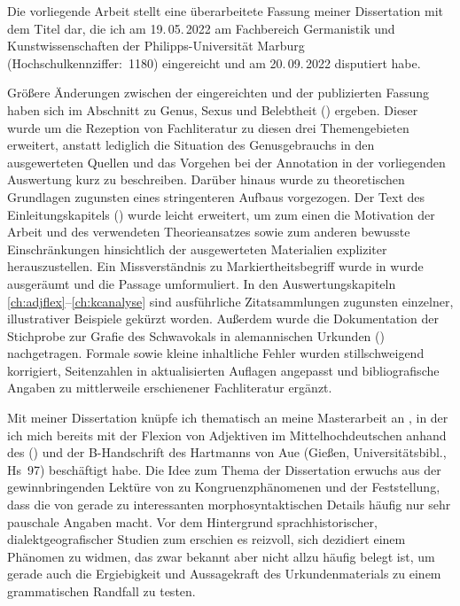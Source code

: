 \addchap{\lsPrefaceTitle}

Die vorliegende Arbeit stellt eine überarbeitete Fassung meiner Dissertation
mit dem Titel  dar, die ich am 19.\,05.\,2022 am Fachbereich
Germanistik und Kunstwissenschaften der Philipps-Universität Marburg
(Hochschulkennziffer:~1180) eingereicht und am 20.\,09.\,2022 disputiert habe.

Größere Änderungen zwischen der eingereichten und der publizierten Fassung
haben sich im Abschnitt zu Genus, Sexus und Belebtheit ()
ergeben. Dieser wurde um die Rezeption von Fachliteratur zu diesen drei
Themengebieten erweitert, anstatt lediglich die Situation des Genusgebrauchs in
den ausgewerteten Quellen und das Vorgehen bei der Annotation in der
vorliegenden Auswertung kurz zu beschreiben. Darüber hinaus wurde
 zu theoretischen Grundlagen zugunsten eines stringenteren
Aufbaus vorgezogen. Der Text des Einleitungskapitels ()
wurde leicht erweitert, um zum einen die Motivation der Arbeit und des
verwendeten Theorieansatzes sowie zum anderen bewusste Einschränkungen
hinsichtlich der ausgewerteten Materialien expliziter herauszustellen. Ein
Missverständnis zu  Markiertheitsbegriff wurde in
 wurde ausgeräumt und die Passage umformuliert. In
den Auswertungskapiteln \ref{ch:adjflex}--\ref{ch:kcanalyse} sind ausführliche
Zitatsammlungen zugunsten einzelner, illustrativer Beispiele gekürzt worden.
Außerdem wurde die Dokumentation der Stichprobe zur Grafie des Schwa\-vokals in
alemannischen Urkunden () nachgetragen. Formale sowie
kleine inhaltliche Fehler wurden stillschweigend korrigiert, Seitenzahlen in
aktualisierten Auflagen angepasst und bibliografische Angaben zu mittlerweile
erschienener Fach\-literatur ergänzt.

Mit meiner Dissertation knüpfe ich thematisch an meine Masterarbeit an
\autocite{becker2016}, in der ich mich bereits mit der Flexion von Adjektiven
im Mittelhochdeutschen anhand des  (\CAO) und der B-Handschrift des  Hartmanns von
Aue (Gießen, Universitätsbibl., Hs~97) beschäftigt habe. Die Idee zum Thema der
Dissertation erwuchs aus der gewinnbringenden Lektüre von \citet{corbett2006}
zu Kongruenz\-phänomenen und der Feststellung, dass die  von \citet{paul2007} gerade zu interessanten morpho\-syntaktischen
Details häufig nur sehr pauschale Angaben macht. Vor dem Hintergrund
sprach\-historischer, dialekt\-geografischer Studien zum \CAO{}
\autocite{beckerschallert2021,beckerschallert2022a, beckerschallert2022b}
erschien es reizvoll, sich dezidiert einem Phänomen zu widmen, das zwar bekannt
aber nicht allzu häufig belegt ist, um gerade auch die Ergiebigkeit und
Aussagekraft des Urkunden\-materials zu einem grammatischen Randfall zu testen.

